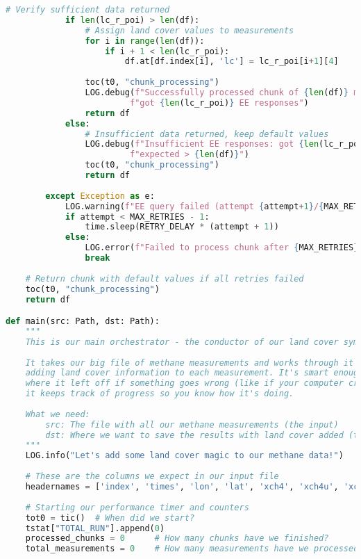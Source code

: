 \begin{lstlisting}[language=Python, caption=Land Cover Classification Addition Algorithm, label=alg:step02_add_lc, breaklines=true]
            # Verify sufficient data returned
            if len(lc_r_poi) > len(df):
                # Assign land cover values to measurements
                for i in range(len(df)):
                    if i + 1 < len(lc_r_poi):
                        df.at[df.index[i], 'lc'] = lc_r_poi[i+1][4]
                
                toc(t0, "chunk_processing")
                LOG.debug(f"Successfully processed chunk of {len(df)} measurements, "
                         f"got {len(lc_r_poi)} EE responses")
                return df
            else:
                # Insufficient data returned, keep default values
                LOG.debug(f"Insufficient EE responses: got {len(lc_r_poi)}, "
                         f"expected > {len(df)}")
                toc(t0, "chunk_processing")
                return df
                    
        except Exception as e:
            LOG.warning(f"EE query failed (attempt {attempt+1}/{MAX_RETRIES}): {e}")
            if attempt < MAX_RETRIES - 1:
                time.sleep(RETRY_DELAY * (attempt + 1))
            else:
                LOG.error(f"Failed to process chunk after {MAX_RETRIES} attempts")
                break
    
    # Return chunk with default values if all retries failed
    toc(t0, "chunk_processing")
    return df

def main(src: Path, dst: Path):
    """
    This is our main orchestrator - the conductor of our land cover symphony!
    
    It takes our big file of methane measurements and works through it chunk by chunk,
    adding land cover information to each measurement. It's smart enough to pick up 
    where it left off if something goes wrong (like if your computer crashes), and 
    it keeps track of progress so you know how it's doing.
    
    What we need:
        src: The file with all our methane measurements (the input)
        dst: Where we want to save the results with land cover added (the output)
    """
    LOG.info("Let's add some land cover magic to our methane data!")
    
    # These are the columns we expect in our input file
    headernames = ['index', 'times', 'lon', 'lat', 'xch4', 'xch4u', 'xco', 'xcou']
    
    # Starting our performance timer and counters
    tot0 = tic()  # When did we start?
    tstat["TOTAL_RUN"].append(0)
    processed_chunks = 0      # How many chunks have we finished?
    total_measurements = 0    # How many measurements have we processed?
    

\end{lstlisting}
